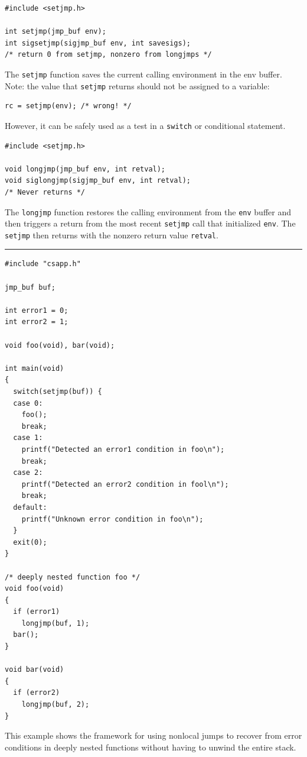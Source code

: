 \documentclass[11pt]{article}
\begin{document}
\begin{verbatim}
#include <setjmp.h>

int setjmp(jmp_buf env);
int sigsetjmp(sigjmp_buf env, int savesigs);
/* return 0 from setjmp, nonzero from longjmps */
\end{verbatim}
The \texttt{setjmp} function saves the current calling environment in the env buffer.\\
Note: the value that \texttt{setjmp} returns should not be assigned to a variable:\\
\begin{verbatim}
rc = setjmp(env); /* wrong! */
\end{verbatim}
However, it can be safely used as a test in a \texttt{switch} or conditional statement.\\


\begin{verbatim}
#include <setjmp.h>

void longjmp(jmp_buf env, int retval);
void siglongjmp(sigjmp_buf env, int retval);
/* Never returns */
\end{verbatim}

The \texttt{longjmp} function restores the calling environment from the \texttt{env} buffer and then triggers a return from the most recent \texttt{setjmp} call that initialized \texttt{env}. The \texttt{setjmp} then returns with the nonzero return value \texttt{retval}.\\

\noindent\rule{\textwidth}{0.5pt}
\begin{verbatim}
#include "csapp.h"

jmp_buf buf;

int error1 = 0;
int error2 = 1;

void foo(void), bar(void);

int main(void)
{
  switch(setjmp(buf)) {
  case 0:
    foo();
    break;
  case 1:
    printf("Detected an error1 condition in foo\n");
    break;
  case 2:
    printf("Detected an error2 condition in fool\n");
    break;
  default:
    printf("Unknown error condition in foo\n");
  }
  exit(0);
}

/* deeply nested function foo */
void foo(void)
{
  if (error1)
    longjmp(buf, 1);
  bar();
}

void bar(void)
{
  if (error2)
    longjmp(buf, 2);
}
\end{verbatim}

This example shows the framework for using nonlocal jumps to recover from error conditions in deeply nested functions without having to unwind the entire stack.\\
\end{document}
